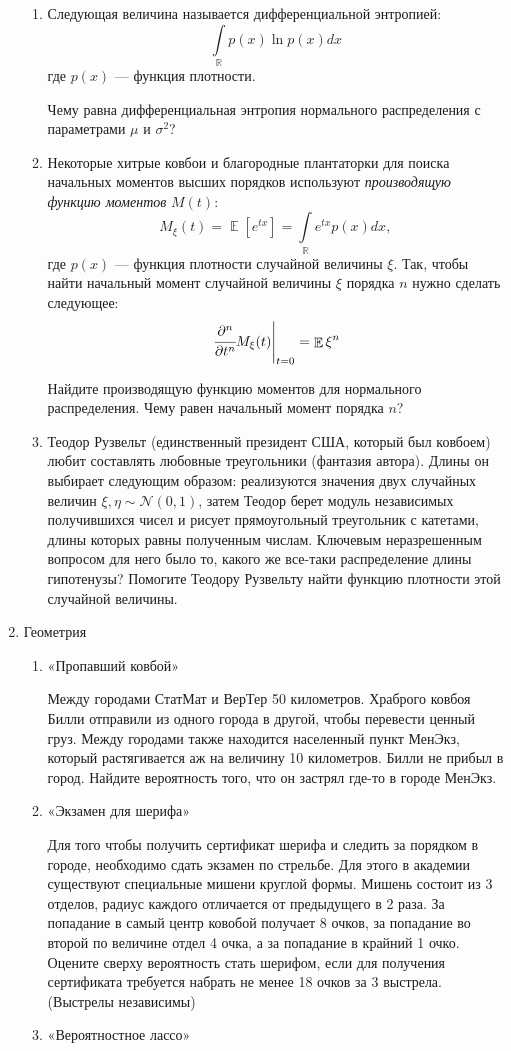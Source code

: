 \documentclass[11pt, a4paper]{article}
\DeclareMathOperator{\E}{\mathbb{E}}
\newcommand{\cN}{\mathcal{N}}
\def \R{\mathbb{R}}
\theoremstyle{definition}
\begin{document}
\begin{enumerate}
\begin{enumerate}
    \item Следующая величина называется дифференциальной энтропией: \[\int\limits_{\R} p(x)\ln p(x) dx \]
    где $p(x)$ — функция плотности.
    
    Чему равна дифференциальная энтропия нормального распределения с параметрами $\mu$ и $\sigma^2$?
    
    \newpage
    
    \item Некоторые хитрые ковбои и благородные плантаторки для поиска начальных моментов высших порядков используют \textit{производящую функцию моментов} $M(t)$:\[M_{\xi}(t)=\E [e^{tx}]=\int\limits_{\R} e^{tx}p(x)dx, \]
    где $p(x)$ — функция плотности случайной величины $\xi$. Так, чтобы найти начальный момент случайной величины $\xi$ порядка $n$ нужно сделать следующее: \[\left. \cfrac{\partial^n}{\partial t^n}M_{\xi}(t)\right|_{t=0}=\E \xi^n \] 
    
    Найдите производящую функцию моментов для нормального распределения. Чему равен начальный момент порядка $n$?
    
    \item Теодор Рузвельт (единственный президент США, который был ковбоем) любит составлять любовные треугольники (фантазия автора). Длины он выбирает следующим образом: реализуются значения двух случайных величин $\xi, \eta\sim \cN(0,1)$, затем Теодор берет модуль независимых получившихся чисел и рисует прямоугольный треугольник с катетами, длины которых равны полученным числам. Ключевым неразрешенным вопросом для него было то, какого же все-таки распределение длины гипотенузы? Помогите Теодору Рузвельту найти функцию плотности этой случайной величины.
\end{enumerate}
    
    \item Геометрия
\begin{enumerate}
    \item «Пропавший ковбой»

    Между городами СтатМат и ВерТер 50 километров. Храброго ковбоя Билли отправили из одного города в другой, чтобы перевести ценный груз. Между городами также находится населенный пункт МенЭкз, который растягивается аж на величину 10 километров. Билли не прибыл в город. Найдите вероятность того, что он застрял где-то в городе МенЭкз. 
    \item «Экзамен для шерифа»
    
    Для того чтобы получить сертификат шерифа и следить за порядком в городе, необходимо сдать экзамен по стрельбе. Для этого в академии существуют специальные мишени круглой формы. Мишень состоит из 3 отделов, радиус каждого отличается от предыдущего в 2 раза. За попадание в самый центр ковобой получает 8 очков, за попадание во второй по величине отдел 4 очка, а за попадание в крайний 1 очко. Оцените сверху вероятность стать шерифом, если для получения сертификата требуется набрать не менее 18 очков за 3 выстрела. (Выстрелы независимы) %
    \item «Вероятностное лассо»
    

\end{enumerate}
\end{enumerate}
\end{document}

